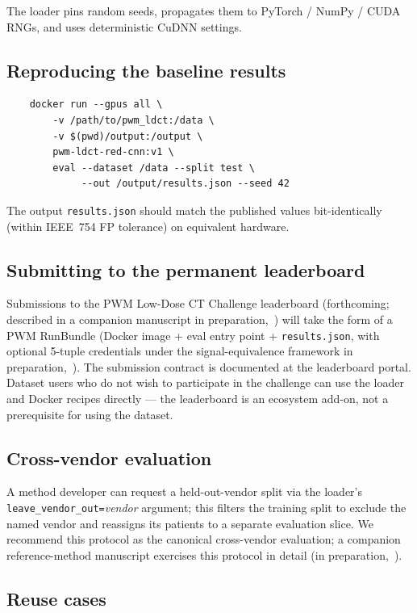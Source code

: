 \documentclass[twoside,11pt]{article}
\begin{document}
The loader pins random seeds, propagates them to PyTorch / NumPy / CUDA RNGs, and uses deterministic CuDNN settings.

\subsection*{Reproducing the baseline results}

\begin{verbatim}
    docker run --gpus all \
        -v /path/to/pwm_ldct:/data \
        -v $(pwd)/output:/output \
        pwm-ldct-red-cnn:v1 \
        eval --dataset /data --split test \
             --out /output/results.json --seed 42
\end{verbatim}

The output \texttt{results.json} should match the published values bit-identically (within IEEE~754 FP tolerance) on equivalent hardware.

\subsection*{Submitting to the permanent leaderboard}

Submissions to the PWM Low-Dose CT Challenge leaderboard (forthcoming; described in a companion manuscript in preparation,~\citealt{ws4leaderboard}) will take the form of a PWM RunBundle (Docker image + eval entry point + \texttt{results.json}, with optional 5-tuple credentials under the signal-equivalence framework in preparation,~\citealt{ws2framework}). The submission contract is documented at the leaderboard portal. Dataset users who do not wish to participate in the challenge can use the loader and Docker recipes directly --- the leaderboard is an ecosystem add-on, not a prerequisite for using the dataset.

\subsection*{Cross-vendor evaluation}

A method developer can request a held-out-vendor split via the loader's \texttt{leave\_vendor\_out=}\textit{vendor} argument; this filters the training split to exclude the named vendor and reassigns its patients to a separate evaluation slice. We recommend this protocol as the canonical cross-vendor evaluation; a companion reference-method manuscript exercises this protocol in detail (in preparation,~\citealt{ws3reference}).

\subsection*{Reuse cases}
\end{document}
